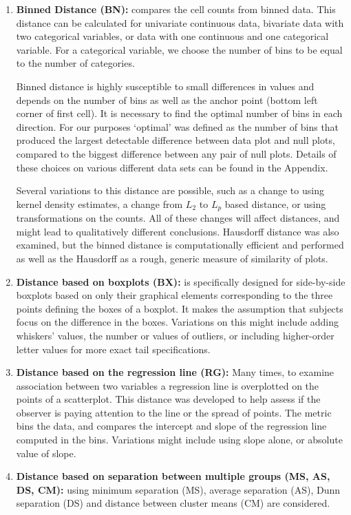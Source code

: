 \documentclass[12pt]{article}\usepackage[]{graphicx}\usepackage[]{color}
\begin{document}
\begin{enumerate}

\item {\bf Binned Distance (BN):} compares the cell counts from binned data. This distance can be calculated for univariate continuous data, bivariate data with two categorical variables, or data with one continuous and one categorical variable. For a categorical variable, we choose the number of bins  to be equal to the number of categories.

Binned distance is highly susceptible to small differences in values and depends on the number of bins as well as the anchor point (bottom left corner of first cell). It is necessary to find the optimal number of bins in each direction. For our purposes `optimal' was defined as the number of bins that produced the largest detectable difference between data plot  and null plots, compared to the biggest difference between any pair of null plots. Details of these choices on various different data sets can be found in the Appendix.

Several variations to this distance are possible, such as a change to using kernel density estimates, a change from $L_2$ to $L_p$ based distance, or using transformations on the counts. All of these changes will affect distances, and might lead to qualitatively different conclusions.
Hausdorff distance \citep{huttenlocher:1993} was also examined, but the binned distance is computationally efficient and performed as well as the Hausdorff as a rough, generic measure of similarity of plots.

\item {\bf Distance based on boxplots (BX):} is specifically designed for side-by-side boxplots based on only their graphical elements corresponding to the three points defining the boxes of a boxplot. It makes the assumption that subjects focus on the difference in the boxes. Variations on this might include adding whiskers' values, the number or values of outliers, or including higher-order letter values \citep{tukey:1977, lvplot} for more exact tail specifications. 

\item {\bf Distance based on the regression line (RG):} Many times, to examine association between two variables a regression line is overplotted on the points of a scatterplot. This distance was developed to help assess if the observer is paying attention to the line or the spread of points. The metric bins the data, and compares the intercept and slope of the regression line computed in the bins. Variations might include using slope alone, or absolute value of slope. 
\item {\bf Distance based on separation between multiple groups (MS, AS, DS, CM):} using minimum separation (MS), average separation (AS), Dunn separation (DS) and distance between cluster means (CM) are considered. 
\end{enumerate}
\end{document}
